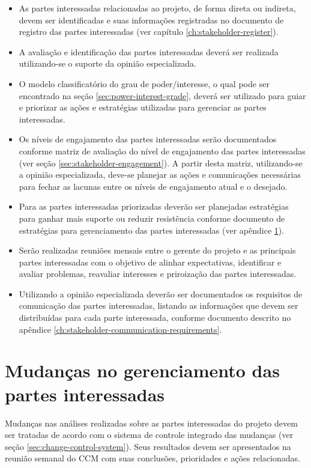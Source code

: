 \begin{itemize}
	\item As partes interessadas relacionadas ao projeto, de forma direta ou indireta, devem ser identificadas e suas informações registradas no documento de registro das partes interessadas (ver capítulo \ref{ch:stakeholder-register}).
	\item A avaliação e identificação das partes interessadas deverá ser realizada utilizando-se o suporte da opinião especializada.
    \item O modelo classificatório do grau de poder/interesse, o qual pode ser encontrado na seção \ref{sec:power-interest-grade}, deverá ser utilizado para guiar e priorizar as ações e estratégias utilizadas para gerenciar as partes interessadas. %
	\item Os níveis de engajamento das partes interessadas serão documentados conforme matriz de avaliação do nível de engajamento das partes interessadas (ver seção \ref{sec:stakeholder-engagement}). A partir desta matriz, utilizando-se a opinião especializada, deve-se planejar as ações e comunicações necessárias para fechar as lacunas entre os níveis de engajamento atual e o desejado.
    \item Para as partes interessadas priorizadas deverão ser planejadas estratégias para ganhar mais suporte ou reduzir resistência conforme documento de estratégias para gerenciamento das partes interessadas (ver apêndice \ref{}).
    \item Serão realizadas reuniões mensais entre o gerente do projeto e as principais partes interessadas com o objetivo de alinhar expectativas, identificar e avaliar problemas, reavaliar interesses e priroização das partes interessadas.
	\item Utilizando a opinião especializada deverão ser documentados os requisitos de comunicação das partes interessadas, listando as informações que devem ser distribuídas para cada parte interessada, conforme documento descrito no apêndice \ref{ch:stakeholder-communication-requirements}.
\end{itemize}

\section{Mudanças no gerenciamento das partes interessadas}

Mudanças nas análises realizadas sobre as partes interessadas do projeto devem ser tratadas de acordo com o sistema de controle integrado das mudanças (ver seção \ref{sec:change-control-system}). Seus resultados devem ser apresentados na reunião semanal do CCM com suas conclusões, prioridades e ações relacionadas.

